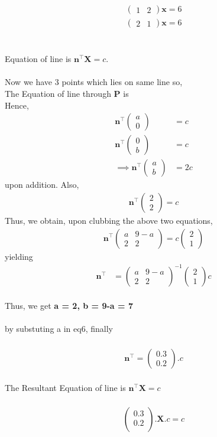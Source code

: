 \documentclass[journal,12pt,twocolumn]{IEEEtran}
\newcommand{\myvec}[1]{\ensuremath{\begin{pmatrix}#1\end{pmatrix}}}
\let\vec\mathbf
\begin{document}
\begin{align}
\myvec{1 & 2}\vec{x} = 6
	\\
	\myvec{2&1}\vec{x} = 6
\end{align}
\iffalse
\\
\\
Equation of line is ${\vec{n^{\top}}\vec{X}} = c$.\\
\\
Now we have 3 points which lies on same line so,\\
 The Equation of line through ${\vec{P}}$ is\\
 Hence, 
\begin{align}
	\vec{n}^{\top}
	\myvec{
  a\\
  0}
  &= c 
\\
	\vec{n}^{\top}
     \myvec{
  0\\
  b
 }
	&= c 
  \\
  \implies 
	\vec{n}^{\top}
	\myvec{
  a\\
  b
}
	&= 2c 
\end{align}
upon addition.
Also, 
\begin{align}
	\vec{n}^{\top}
	\myvec{
  2\\
  2}
  = c 
\end{align}
	Thus, we obtain, upon clubbing the above two equations,
 \begin{align}
	 \vec{n}^{\top}
	 \myvec{
  a & 9-a\\
  2 & 2
 }
	 = c\myvec{
  2\\
  1}
\end{align}
yielding
 \begin{align}
	 \vec{n^{\top}} &= 
	 \myvec{
  a & 9-a\\
  2 & 2
 }
  ^{-1}
	 \myvec{
  2\\
  1}
 c 
\end{align}
%
  \\
  Thus, we get \textbf{a = 2, b = 9-a = 7}\\
  \\
  by substuting a in eq6, finally\\
  \\
   \begin{align}
	   \vec{n^{\top}} = 
	   \myvec{
  0.3\\
  0.2}
 .c
 \end{align}
  \\
The Resultant Equation of line is ${\vec{n^{\top}}\vec{X}} = c$ \\
\\
 \begin{align}
	 \myvec{
  0.3\\
  0.2\\
 }
	 .\vec{X}.c = c
 \end{align}
\end{document}
